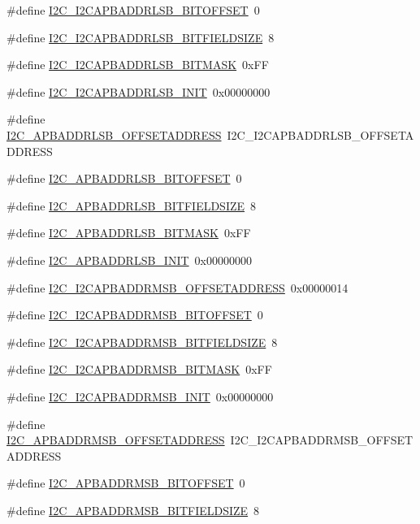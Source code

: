\begin{DoxyCompactItemize}
\item 
\#define \hyperlink{a00558_a32d7f38449c86c3a97136ea2218b9111}{I2C\_\-I2CAPBADDRLSB\_\-BITOFFSET}~0
\item 
\#define \hyperlink{a00558_a2255c0a80a071541bb5eab1777decad0}{I2C\_\-I2CAPBADDRLSB\_\-BITFIELDSIZE}~8
\item 
\#define \hyperlink{a00558_a38f47cb474d1294b5d8adf7825e8b7a5}{I2C\_\-I2CAPBADDRLSB\_\-BITMASK}~0xFF
\item 
\#define \hyperlink{a00558_afb2b59f44c28d89f83308eeebad263b9}{I2C\_\-I2CAPBADDRLSB\_\-INIT}~0x00000000
\item 
\#define \hyperlink{a00558_a8c3824488b6c53e3d9dd5ff856d79649}{I2C\_\-APBADDRLSB\_\-OFFSETADDRESS}~I2C\_\-I2CAPBADDRLSB\_\-OFFSETADDRESS
\item 
\#define \hyperlink{a00558_abb423f5773ddc2920b6ea4fe5b3b8a0b}{I2C\_\-APBADDRLSB\_\-BITOFFSET}~0
\item 
\#define \hyperlink{a00558_a4e392cedc6e73a7439c99ae5bc1fc448}{I2C\_\-APBADDRLSB\_\-BITFIELDSIZE}~8
\item 
\#define \hyperlink{a00558_a88cb2efffaff031e3be69fe5ba08837b}{I2C\_\-APBADDRLSB\_\-BITMASK}~0xFF
\item 
\#define \hyperlink{a00558_a03eda352901f56bf7d34337af8d0fe56}{I2C\_\-APBADDRLSB\_\-INIT}~0x00000000
\item 
\#define \hyperlink{a00558_a5777253e1faa622ad5ad42402fc4a0e5}{I2C\_\-I2CAPBADDRMSB\_\-OFFSETADDRESS}~0x00000014
\item 
\#define \hyperlink{a00558_a0c0b1ce60c58ece15403fce1ec15518a}{I2C\_\-I2CAPBADDRMSB\_\-BITOFFSET}~0
\item 
\#define \hyperlink{a00558_a522b2c6386aacb5354b44273609daa6e}{I2C\_\-I2CAPBADDRMSB\_\-BITFIELDSIZE}~8
\item 
\#define \hyperlink{a00558_af7653d84caf2269a9347d83d6e3b4166}{I2C\_\-I2CAPBADDRMSB\_\-BITMASK}~0xFF
\item 
\#define \hyperlink{a00558_a0f2f1cebf888bd0d6d2f5d0b76259af5}{I2C\_\-I2CAPBADDRMSB\_\-INIT}~0x00000000
\item 
\#define \hyperlink{a00558_aed5b730cb37ca4aa5e44da65e4d84583}{I2C\_\-APBADDRMSB\_\-OFFSETADDRESS}~I2C\_\-I2CAPBADDRMSB\_\-OFFSETADDRESS
\item 
\#define \hyperlink{a00558_a1f0f55d8d9e2506cc3837fd36485c96f}{I2C\_\-APBADDRMSB\_\-BITOFFSET}~0
\item 
\#define \hyperlink{a00558_aa06b5941a59937fb82f4c5680a0d85ae}{I2C\_\-APBADDRMSB\_\-BITFIELDSIZE}~8
\item 

\end{DoxyCompactItemize}
